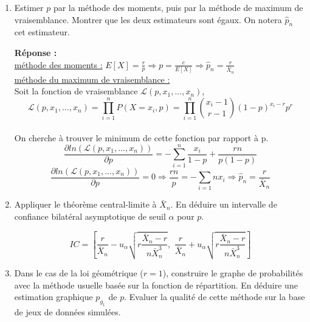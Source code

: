 \documentclass[12pt]{article}
\newcommand{\dsp}{\displaystyle}
\begin{document}
\begin{enumerate}

\renewcommand{\labelenumi}{\arabic{section}.\arabic{enumi}.}

\item Estimer $p$ par la méthode des moments, puis par la méthode de maximum de vraisemblance. Montrer que les deux estimateurs sont égaux. On notera $\hat{p}_n$ cet estimateur.

\textbf{Réponse :\\}
\underline{méthode des moments :} $E[X] = \dsp \frac{r}{p} \Rightarrow p = \frac{e}{E[X]} \Rightarrow \hat{p}_n = \frac{r}{\bar{X}_n} $ \\
\underline{méthode du maximum de vraisemblance :} \\
Soit  la fonction de vraisemblance $\mathcal{L}(p, x_{1}, ..., x_{n})$,\\$$\mathcal{L}(p, x_{1}, ... , x_{n}) = \prod_{i=1}^{n}P(X=x_{i}, p)  = \prod_{i=1}^n \binom{x_i-1}{r-1}(1-p)^{x_i-r}p^r$$ \\
On cherche à trouver le minimum de cette fonction par rapport à p. \\
\[\frac{\partial{ln(\mathcal{L}(p, x_{1}, ... , x_{n}))}}{\partial{p}} = -\sum_{i=1}^{n} \frac{x_{i}}{1-p} + \frac{rn}{p(1-p)}\]
\[\frac{\partial{ln(\mathcal{L}(p, x_{1}, ... , x_{n}))}}{\partial{p}} = 0 \Rightarrow \frac{rn}{p} = -\sum_{i=1}{n} x_{i} \Rightarrow \hat{p}_n = \frac{r}{\bar{X}_n}\]
\vspace{3mm}

\item Appliquer le théorème central-limite à $\bar{X}_n$. En déduire un intervalle de confiance bilatéral asymptotique de seuil $\alpha$ pour $p$.

$$ IC = \left[ \frac{r}{\bar{X}_n} - u_{\alpha} \sqrt{r\frac{\bar{X}_n - r}{n\bar{X}_n^3}} ,\,\, \frac{r}{\bar{X}_n} + u_{\alpha} \sqrt{r\frac{\bar{X}_n - r}{n\bar{X}_n^3}}  \right] $$

\vspace{3mm}

\item Dans le cas de la loi géométrique ($r=1$), construire le graphe de probabilités avec la méthode usuelle basée sur la fonction de répartition. En déduire une estimation graphique $p_{g_1}$ de $p$. Evaluer la qualité de cette méthode sur la base de jeux de données simulées.


\end{enumerate}
\end{document}
